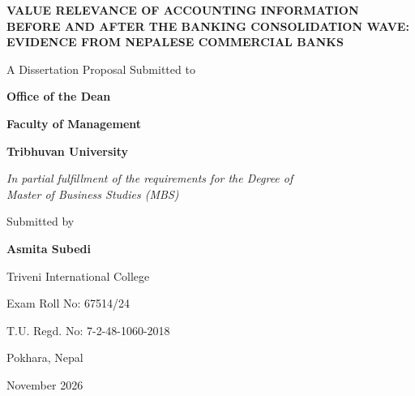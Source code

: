 \begin{titlepage}
\thispagestyle{empty}
\singlespacing
\setlength{\parskip}{0pt}
\begin{center}

{\fontsize{18}{22}\selectfont\bfseries VALUE RELEVANCE OF ACCOUNTING INFORMATION BEFORE AND AFTER THE BANKING CONSOLIDATION WAVE: EVIDENCE FROM NEPALESE COMMERCIAL BANKS\par}

\vspace{3.8cm}

{\fontsize{13}{16}\selectfont A Dissertation Proposal Submitted to\par}
\vspace{0.25cm}
{\fontsize{13}{16}\selectfont\bfseries Office of the Dean\par}
{\fontsize{13}{16}\selectfont\bfseries Faculty of Management\par}
{\fontsize{13}{16}\selectfont\bfseries Tribhuvan University\par}

\vspace{1.5cm}

{\fontsize{12}{16}\selectfont \textit{In partial fulfillment of the requirements for the Degree of\\Master of Business Studies (MBS)}\par}

\vspace{1.8cm}

{\fontsize{13}{16}\selectfont Submitted by\par}
\vspace{0.25cm}
{\fontsize{12}{16}\selectfont\bfseries Asmita Subedi\par}
{\fontsize{12}{16}\selectfont Triveni International College\par}
{\fontsize{12}{16}\selectfont Exam Roll No: 67514/24\par}
{\fontsize{12}{16}\selectfont T.U. Regd. No: 7-2-48-1060-2018\par}

\vfill

{\fontsize{12}{15}\selectfont Pokhara, Nepal\par}
{\fontsize{12}{15}\selectfont November 2026\par}

\end{center}
\end{titlepage}

